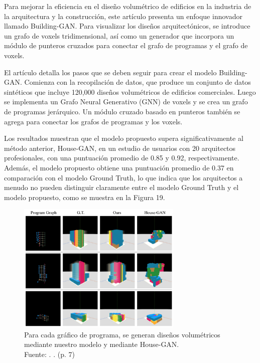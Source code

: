Para mejorar la eficiencia en el diseño volumétrico de edificios en la industria de la arquitectura y la construcción, este artículo presenta un enfoque innovador llamado Building-GAN. Para visualizar los diseños arquitectónicos, se introduce un grafo de voxels tridimensional, así como un generador que incorpora un módulo de punteros cruzados para conectar el grafo de programas y el grafo de voxels.

El artículo detalla los pasos que se deben seguir para crear el modelo Building-GAN. Comienza con la recopilación de datos, que produce un conjunto de datos sintéticos que incluye 120,000 diseños volumétricos de edificios comerciales. Luego se implementa un Grafo Neural Generativo (GNN) de voxels y se crea un grafo de programas jerárquico. Un módulo cruzado basado en punteros también se agrega para conectar los grafos de programas y los voxels.

Los resultados muestran que el modelo propuesto supera significativamente al método anterior, House-GAN, en un estudio de usuarios con 20 arquitectos profesionales, con una puntuación promedio de 0.85 y 0.92, respectivamente. Además, el modelo propuesto obtiene una puntuación promedio de 0.37 en comparación con el modelo Ground Truth, lo que indica que los arquitectos a menudo no pueden distinguir claramente entre el modelo Ground Truth y el modelo propuesto, como se muestra en la Figura 19.

\begin{figure}[!ht]
	\begin{center}
		\includegraphics[width=0.7\textwidth]{2/figures/chang2021.png}
		\caption[Para cada gráfico de programa, se generan diseños volumétricos mediante nuestro modelo y mediante House-GAN]{Para cada gráfico de programa, se generan diseños volumétricos mediante nuestro modelo y mediante House-GAN.\\
		Fuente: \cite{pr_chang2021buildinggan}. . (p. 7)}
		\label{2:fig127}
	\end{center}
\end{figure}

